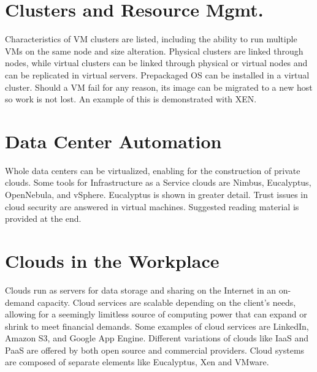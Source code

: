 \section{Clusters and Resource Mgmt.}

Characteristics of VM clusters are listed, including the ability to run
multiple VMs on the same node and size alteration. Physical clusters are
linked through nodes, while virtual clusters can be linked through
physical or virtual nodes and can be replicated in virtual servers.
Prepackaged OS can be installed in a virtual cluster. Should a VM fail
for any reason, its image can be migrated to a new host so work is not
lost. An example of this is demonstrated with XEN.



\section{Data Center Automation}

Whole data centers can be virtualized, enabling for the construction of
private clouds. Some tools for Infrastructure as a Service clouds are
Nimbus, Eucalyptus, OpenNebula, and vSphere. Eucalyptus is shown in
greater detail. Trust issues in cloud security are answered in virtual
machines. Suggested reading material is provided at the end.



\section{Clouds in the Workplace}

Clouds run as servers for data storage and sharing on the Internet in an
on-demand capacity. Cloud services are scalable depending on the
client's needs, allowing for a seemingly limitless source of computing
power that can expand or shrink to meet financial demands. Some examples
of cloud services are LinkedIn, Amazon S3, and Google App Engine.
Different variations of clouds like IaaS and PaaS are offered by both
open source and commercial providers. Cloud systems are composed of
separate elements like Eucalyptus, Xen and VMware.

